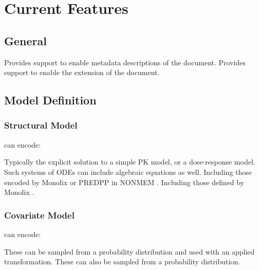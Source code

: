 \section{Current Features}

\subsection{General}

\begin{features}
 Provides support to enable metadata
descriptions of the \pharmml document.
 Provides support to enable the extension of
the \pharmml document.
\end{features}

\subsection{Model Definition}

\subsubsection{Structural Model}

\pharmml can encode:
\begin{features}
 Typically the explicit solution to a simple PK model, or a dose-response model.
 Such systems of ODEs can include algebraic equations as well.
 Including those encoded by Monolix \cite{Bertrand:2008} or PREDPP in NONMEM \cite{PREDPP:2011}.
 Including those defined by Monolix \cite{Bertrand:2008}.
\end{features}

\subsubsection{Covariate Model}

\pharmml can encode:
\begin{features}
 These can be sampled from a probability distribution and used with an applied transformation.
 These can also be sampled from a probability distribution.
\end{features}

